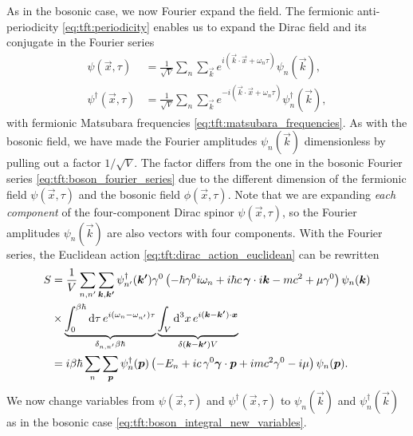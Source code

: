 As in the bosonic case, we now Fourier expand the field.
The fermionic anti-periodicity \eqref{eq:tft:periodicity} enables us to expand the Dirac field and its conjugate in the Fourier series
\begin{subequations}
\begin{align}
	\psi(\vec{x}, \tau)         &= \frac{1}{\sqrt{V}} \sum_n \sum_\vec{k} e^{i (\vec{k} \cdot \vec{x} + \omega_n \tau)} \psi_{n}(\vec{k}), \\
	\psi^\dagger(\vec{x}, \tau) &= \frac{1}{\sqrt{V}} \sum_n \sum_\vec{k} e^{-i (\vec{k} \cdot \vec{x} + \omega_n \tau)} \psi_{n}^\dagger(\vec{k}) ,
\label{eq:tft:dirac_fourier_series}
\end{align}
\end{subequations}
with fermionic Matsubara frequencies \eqref{eq:tft:matsubara_frequencies}.
As with the bosonic field, we have made the Fourier amplitudes $\psi_n(\vec{k})$ dimensionless by pulling out a factor $1/\sqrt{V}$.
The factor differs from the one in the bosonic Fourier series \eqref{eq:tft:boson_fourier_series} due to the different dimension of the fermionic field $\psi(\vec{x}, \tau)$ and the bosonic field $\phi(\vec{x}, \tau)$.
Note that we are expanding \emph{each component} of the four-component Dirac spinor $\psi(\vec{x}, \tau)$, so the Fourier amplitudes $\psi_n(\vec{k})$ are also vectors with four components.
With the Fourier series, the Euclidean action \eqref{eq:tft:dirac_action_euclidean} can be rewritten
\begin{equation}
\begin{split}
	S & = \frac{1}{V} \sum_{n,n'} \sum_{{\bm{k}},{\bm{k'}}} \psi^\dagger_{n'}({\bm{k'}}) \gamma^0 \left( -\hbar \gamma^0 i \omega_n + i \hbar c \, {\bm{\gamma}} \cdot i {\bm{k}} - m c^2 + \mu \gamma^0 \right) \psi_n({\bm{k}}) \\
	  & \times \underbrace{\int_0^{\beta \hbar} \mathop{}\!\mathrm{d} \tau \, e^{i(\omega_n-\omega_{n'})\tau}}_{\delta_{n,n'} \beta \hbar} \underbrace{\int_V \mathop{}\!\mathrm{d}^3 x \, e^{i({\bm{k}}-{\bm{k'}})\cdot{\bm{x}}}}_{\delta({\bm{k}} - {\bm{k'}}) V} \\
	  & = i \beta \hbar \sum_{n}   \sum_{{\bm{p}}}         \psi^\dagger_n({\bm{p}})          \left( -E_n + i c \, \gamma^0 {\bm{\gamma}} \cdot {\bm{p}} + i m c^2 \gamma^0 - i \mu \right) \psi_n({\bm{p}}) . \\
\end{split}
\end{equation}
We now change variables from $\psi(\vec{x}, \tau)$ and $\psi^\dagger(\vec{x}, \tau)$ to $\psi_n(\vec{k})$ and $\psi^\dagger_n(\vec{k})$ as in the bosonic case \eqref{eq:tft:boson_integral_new_variables}.

